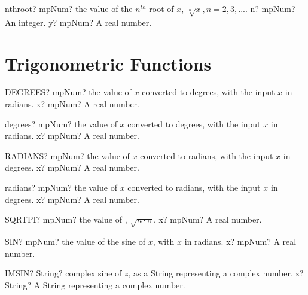 \documentclass[12pt,a4paper,openany]{book}
\begin{document}
\begin{mpFunctionsExtract}
\mpFunctionTwo
{nthroot? mpNum? the value of the $n^{th}$ root of $x$, $\sqrt[n]{x}, n=2,3,...$.}
{n? mpNum? An integer.}
{y? mpNum? A real number.}
\end{mpFunctionsExtract}

\section{Trigonometric Functions}

\begin{mpFunctionsExtract}
\mpWorksheetFunctionOneNotImplemented
{DEGREES? mpNum? the value of $x$ converted to degrees, with the input $x$ in radians.}
{x? mpNum? A real number.}
\end{mpFunctionsExtract}

\begin{mpFunctionsExtract}
\mpFunctionOne
{degrees? mpNum? the value of $x$ converted to degrees, with the input $x$ in radians.}
{x? mpNum? A real number.}
\end{mpFunctionsExtract}

\begin{mpFunctionsExtract}
\mpWorksheetFunctionOneNotImplemented
{RADIANS? mpNum? the value of $x$ converted to radians, with the input $x$ in degrees.}
{x? mpNum? A real number.}
\end{mpFunctionsExtract}

\begin{mpFunctionsExtract}
\mpFunctionOne
{radians? mpNum? the value of $x$ converted to radians, with the input $x$ in degrees.}
{x? mpNum? A real number.}
\end{mpFunctionsExtract}

\begin{mpFunctionsExtract}
\mpWorksheetFunctionOneNotImplemented
{SQRTPI? mpNum? the value of , $\sqrt{n \cdot \pi}$.}
{x? mpNum? A real number.}
\end{mpFunctionsExtract}

\begin{mpFunctionsExtract}
\mpWorksheetFunctionOneNotImplemented
{SIN? mpNum? the value of the sine of $x$, with $x$ in radians.}
{x? mpNum? A real number.}
\end{mpFunctionsExtract}

\begin{mpFunctionsExtract}
\mpWorksheetFunctionOneNotImplemented
{IMSIN? String? complex sine of $z$, as a String representing a complex number.}
{z? String? A String representing a complex number.}
\end{mpFunctionsExtract}
\end{document}
